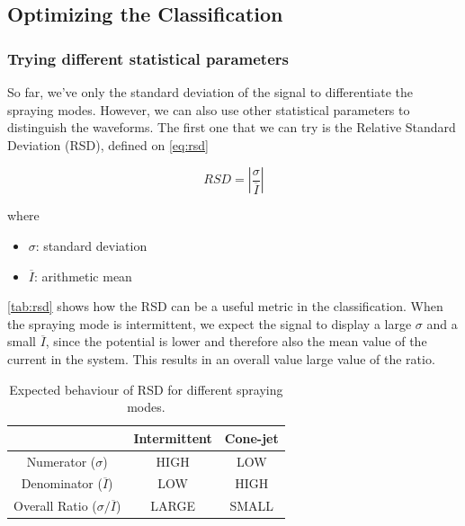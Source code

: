 \documentclass[oneside,12pt]{article}
\begin{document}
\subsection{Optimizing the Classification}

\subsubsection{Trying different statistical parameters}

So far, we've only the standard deviation of the signal to differentiate the spraying modes. However, we can also use other statistical parameters 
to distinguish the waveforms. The first one that we can try is the Relative Standard Deviation (RSD), defined on \autoref{eq:rsd}


\begin{equation} \label{eq:rsd}
    RSD = \left|\frac{\sigma}{\overline{I}}\right|
\end{equation}

where

\begin{itemize}
    \item $\sigma$: standard deviation
    \item $\overline{I}$: arithmetic mean
\end{itemize}

\autoref{tab:rsd} shows how the RSD can be a useful metric in the classification. When the spraying mode is intermittent, we 
expect the signal to display a large $\sigma$ and a small $\overline{I}$, since the potential is lower and therefore also the mean value 
of the current in the system. This results in an overall value large value of the ratio. 

\begin{table}[h!]
    \begin{center}
      \caption{Expected behaviour of RSD for different spraying modes.}
      \label{tab:rsd}
      \begin{tabular}{c|c|c}
        \textbf{} & \textbf{Intermittent} & \textbf{Cone-jet}\\
        \hline
        Numerator ($\sigma$) & HIGH & LOW\\
        Denominator ($\overline{I}$) & LOW& HIGH\\
        Overall Ratio ($\sigma / \overline{I}$) & LARGE & SMALL\\
      \end{tabular}
    \end{center}
  \end{table}
\end{document}
